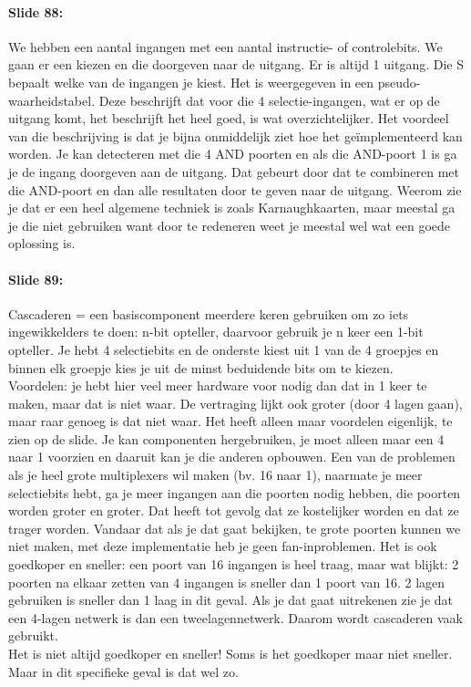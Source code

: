 \documentclass[10pt,a4paper]{book}
\begin{document}
\paragraph{Slide 88:} We hebben een aantal ingangen met een aantal instructie- of controlebits. We gaan er een kiezen en die doorgeven naar de uitgang. Er is altijd 1 uitgang. Die S bepaalt welke van de ingangen je kiest. Het is weergegeven in een pseudo-waarheidstabel. Deze beschrijft dat voor die 4 selectie-ingangen, wat er op de uitgang komt, het beschrijft het heel goed, is wat overzichtelijker. Het voordeel van die beschrijving is dat je bijna onmiddelijk ziet hoe het ge\"implementeerd kan worden. Je kan detecteren met die 4 AND poorten en als die AND-poort 1 is ga je de ingang doorgeven aan de uitgang. Dat gebeurt door dat te combineren met die AND-poort en dan alle resultaten door te geven naar de uitgang. Weerom zie je dat er een heel algemene techniek is zoals Karnaughkaarten, maar meestal ga je die niet gebruiken want door te redeneren weet je meestal wel wat een goede oplossing is.

\paragraph{Slide 89:} Cascaderen = een basiscomponent meerdere keren gebruiken om zo iets ingewikkelders te doen: n-bit opteller, daarvoor gebruik je n keer een 1-bit opteller. Je hebt 4 selectiebits en de onderste kiest uit 1 van de 4 groepjes en binnen elk groepje kies je uit de minst beduidende bits om te kiezen.\\
Voordelen: je hebt hier veel meer hardware voor nodig dan dat in 1 keer te maken, maar dat is niet waar. De vertraging lijkt ook groter (door 4 lagen gaan), maar raar genoeg is dat niet waar. Het heeft alleen maar voordelen eigenlijk, te zien op de slide. Je kan componenten hergebruiken, je moet alleen maar een 4 naar 1 voorzien en daaruit kan je die anderen opbouwen. Een van de problemen als je heel grote multiplexers wil maken (bv. 16 naar 1), naarmate je meer selectiebits hebt, ga je meer ingangen aan die poorten nodig hebben, die poorten worden groter en groter. Dat heeft tot gevolg dat ze kostelijker worden en dat ze trager worden. Vandaar dat als je dat gaat bekijken, te grote poorten kunnen we niet maken, met deze implementatie heb je geen fan-inproblemen. Het is ook goedkoper en sneller: een poort van 16 ingangen is heel traag, maar wat blijkt: 2 poorten na elkaar zetten van 4 ingangen is sneller dan 1 poort van 16. 2 lagen gebruiken is sneller dan 1 laag in dit geval. Als je dat gaat uitrekenen zie je dat een 4-lagen netwerk is dan een tweelagennetwerk. Daarom wordt cascaderen vaak gebruikt.\\
Het is niet altijd goedkoper en sneller! Soms is het goedkoper maar niet sneller. Maar in dit specifieke geval is dat wel zo.
\end{document}
